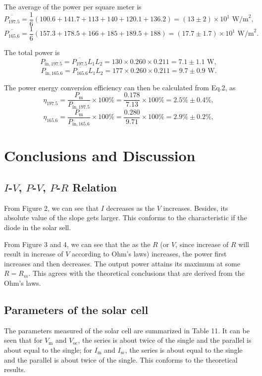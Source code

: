 \documentclass{article}
\begin{document}
{The average of the power per square meter is
$$\overline{P_{197.5}} = \frac{1}{6}(100.6 + 141.7 + 113 + 140 + 120.1 + 136.2) = (13 \pm 2)\times 10^1\,\,\text{W/m}^2,$$
$$\overline{P_{165.6}} = \frac{1}{6}(157.3 + 178.5 + 166 + 185 + 189.5 + 188) = (17.7 \pm 1.7)\times 10^1\,\,\text{W/m}^2.$$

The total power is
$$P_{\text{in},197.5} = \overline{P_{197.5}}L_1L_2 = 130 \times 0.260 \times 0.211 = 7.1 \pm 1.1\,\,\text{W},$$
$$P_{\text{in},165.6} = \overline{P_{165.6}}L_1L_2 = 177 \times 0.260 \times 0.211 = 9.7 \pm 0.9\,\,\text{W}.$$

The power energy conversion efficiency can then be calculated from Eq.2, as
$$\eta_{197.5} = \frac{P_\text{m}}{P_{\text{in},197.5}} \times 100\% = \frac{0.178}{7.13} \times 100\%= 2.5\% \pm 0.4\%,$$
$$\eta_{165.6} = \frac{P_\text{m}}{P_{\text{in},165.6}} \times 100\% = \frac{0.280}{9.71} \times 100\%= 2.9\% \pm 0.2\%,$$

\section{Conclusions and Discussion}

\subsection{$I$-$V$, $P$-$V$, $P$-$R$ Relation}

From Figure 2, we can see that $I$ decreases as the $V$ increases. Besides, its absolute value of the slope gets larger. This conforms to the characteristic if the diode in the solar sell.

From Figure 3 and 4, we can see that the as the $R$ (or $V$, since increase of $R$ will result in increase of $V$ according to Ohm's laws) increases, the power first increases and then decreases. The output power attains its maximum at some $R = R_m$. This agrees with the theoretical conclusions that are derived from the Ohm's laws.

\subsection{Parameters of the solar cell}

The parameters measured of the solar cell are summarized in Table 11. It can be seen that for $V_\text{m}$ and $V_\text{oc}$, the series is about twice of the single and the parallel is about equal to the single; for $I_\text{m}$ and $I_\text{sc}$, the series is about equal to the single and the parallel is about twice of the single. This conforms to the theoretical results.

}
\end{document}

